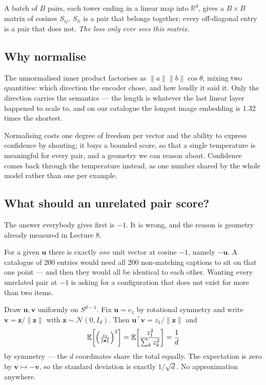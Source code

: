 \documentclass[11pt,a4paper]{article}
\begin{document}
A batch of $B$ pairs, each tower ending in a linear map into $\mathbb{R}^d$,
gives a $B\times B$ matrix of cosines $S_{ij}$. $S_{ii}$ is a pair that belongs
together; every off-diagonal entry is a pair that does not. \emph{The loss only
ever sees this matrix.}

\subsection{Why normalise}

The unnormalised inner product factorises as
$\lVert a\rVert\lVert b\rVert\cos\theta$, mixing two quantities: which
direction the encoder chose, and how loudly it said it. Only the direction
carries the semantics --- the length is whatever the last linear layer happened
to scale to, and on our catalogue the longest image embedding is 1.32 times the
shortest.

Normalising costs one degree of freedom per vector and the ability to express
confidence by shouting; it buys a bounded score, so that a single temperature
is meaningful for every pair, and a geometry we can reason about. Confidence
comes back through the temperature instead, as one number shared by the whole
model rather than one per example.

\subsection{What should an unrelated pair score?}

The answer everybody gives first is $-1$. It is wrong, and the reason is
geometry already measured in Lecture 8.

For a given $\mathbf{u}$ there is exactly \emph{one} unit vector at cosine
$-1$, namely $-\mathbf{u}$. A catalogue of 200 entries would need all 200
non-matching captions to sit on that one point --- and then they would all be
identical to each other. Wanting every unrelated pair at $-1$ is asking for a
configuration that does not exist for more than two items.

\begin{derivbox}[title={Concentration on the sphere}]
Draw $\mathbf{u}, \mathbf{v}$ uniformly on $S^{d-1}$. Fix $\mathbf{u} = e_1$ by
rotational symmetry and write $\mathbf{v} = \mathbf{z}/\lVert\mathbf{z}\rVert$
with $\mathbf{z} \sim \mathcal{N}(0, I_d)$. Then
$\mathbf{u}^{\top}\mathbf{v} = z_1/\lVert\mathbf{z}\rVert$ and
\[ \mathbb{E}\!\left[\Bigl(\tfrac{z_1}{\lVert\mathbf{z}\rVert}\Bigr)^{2}\right]
   = \mathbb{E}\!\left[\frac{z_1^2}{\sum_k z_k^2}\right] = \frac{1}{d} \]
by symmetry --- the $d$ coordinates share the total equally. The expectation is
zero by $\mathbf{v}\mapsto-\mathbf{v}$, so the standard deviation is exactly
$1/\sqrt d$. No approximation anywhere.
\end{derivbox}
\end{document}
